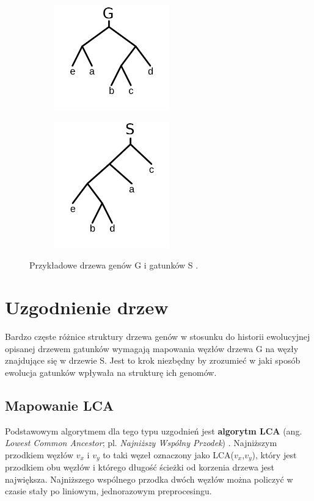 \documentclass[licencjacka]{pracamgr}
\begin{document}
\begin{figure}[H]
\centering
\begin{subfigure}{.5\textwidth}
  \centering
  \includegraphics[width=50mm]{./pictures/gene.png}
  \label{fig:sub2}
\end{subfigure}%
\begin{subfigure}{.5\textwidth}
  \centering
  \includegraphics[width=50mm]{./pictures/species.png}
  \label{fig:sub1}
\end{subfigure}%
\caption{Przykładowe drzewa genów G i gatunków S \cite{gsevol}.}
\label{fig:test}
\end{figure}

\section{Uzgodnienie drzew}
Bardzo częste różnice struktury drzewa genów w stosunku do historii ewolucyjnej opisanej drzewem gatunków wymagają mapowania węzłów drzewa G na węzły znajdujące się w drzewie S. Jest to krok niezbędny by zrozumieć w jaki sposób ewolucja gatunków wpływała na strukturę ich genomów. 

\subsection{Mapowanie LCA}
Podstawowym algorytmem dla tego typu uzgodnień jest \textbf{algorytm LCA} (ang. \textit{Lowest Common Ancestor}; pl. \textit{Najniższy Wspólny Przodek}) \cite{lca}. Najniższym przodkiem węzłów $v_x$ i $v_y$ to taki węzeł oznaczony jako LCA($v_x$,$v_y$), który jest przodkiem obu węzłów i którego długość ścieżki od korzenia drzewa jest największa. Najniższego wspólnego przodka dwóch węzłów można policzyć w czasie stały po liniowym, jednorazowym preprocesingu. 
\end{document}
